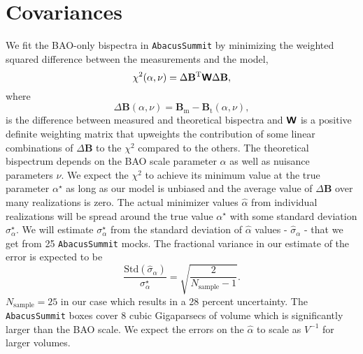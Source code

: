 \section{Covariances}
\label{sec:covariances}

We fit the BAO-only bispectra in \texttt{AbacusSummit} by minimizing the weighted squared difference between the measurements and the model, 
\begin{equation}
\label{eq:weightedsum}
    \chi^2(\alpha, \nu) = \Delta  \mathbf{B}^\mathrm{T} \textbf{\textsf{W}}\Delta \mathbf{B},
\end{equation}
where 
\begin{equation}
    \Delta  \mathbf{B}(\alpha, \nu) = \mathbf{B}_\mathrm{m} - \mathbf{B}_\mathrm{t}(\alpha, \nu),
\end{equation}
is the difference between measured and theoretical bispectra and $\textbf{\textsf{W}}$ is a positive definite weighting matrix that upweights the contribution of some linear combinations of $\Delta  \mathbf{B}$ to the $\chi^2$ compared to the others. The theoretical bispectrum depends on the BAO scale parameter $\alpha$ as well as nuisance parameters $\nu$. We expect the $\chi^2$ to achieve its minimum value at the true parameter $\alpha^\star$ as long as our model is unbiased and the average value of $\Delta  \mathbf{B}$ over many realizations is zero. The actual minimizer values $\widehat{\alpha}$ from individual realizations will be spread around the true value $\alpha^\star$ with some standard deviation $\sigma_\alpha^\star$. We will estimate $\sigma_\alpha^\star$ from the standard deviation of $\widehat{\alpha}$ values - $\widehat{\sigma}_\alpha$ - that we get from 25 \texttt{AbacusSummit} mocks. The fractional variance in our estimate of the error is expected to be
\begin{equation}
\label{eq:samplevariance}
    \frac{\mathrm{Std}(\widehat{\sigma}_\alpha)}{\sigma_\alpha^\star} = \sqrt{\frac{2}{N_\mathrm{sample}-1}}.
\end{equation}
$N_\mathrm{sample} = 25$ in our case which results in a 28 percent uncertainty. The \texttt{AbacusSummit} boxes cover 8 cubic Gigaparsecs of volume which is significantly larger than the BAO scale. We expect the errors on the $\widehat\alpha$ to scale as $V^{-1}$ for larger volumes. 

